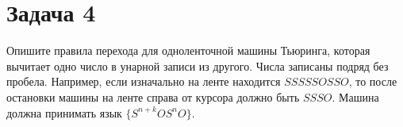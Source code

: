 \section{Задача 4}
Опишите правила перехода для одноленточной машины Тьюринга,
которая вычитает одно число в унарной записи из другого.
Числа записаны подряд без пробела.
Например, если изначально на ленте находится $SSSSSOSSO$,
то после остановки машины на ленте справа от
курсора должно быть $SSSO$.
Машина должна принимать язык $\{S^{n+k} O S^n O\}$.
